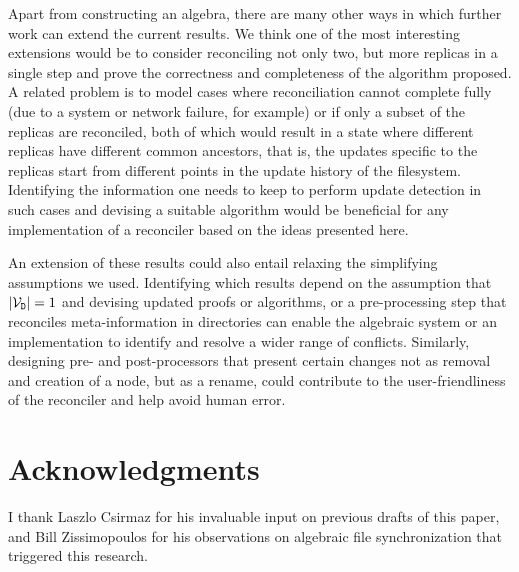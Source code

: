 \documentclass[12pt]{article}
\begin{document}
Apart from constructing an algebra,
there are many other ways in which further work can extend the current results.
We think one of the most interesting extensions would be to
consider reconciling not only two, but more replicas in a single step and
prove the correctness and completeness of the algorithm proposed.
A related problem is to model cases where reconciliation cannot
complete fully (due to a system or network failure, for example)
or if only a subset of the replicas are reconciled,
both of which would result in a state where different replicas
have different common ancestors, that is,
the updates specific to the replicas start from different points
in the update history of the filesystem.
Identifying the information one needs to keep to perform
update detection in such cases and devising a suitable algorithm
would be beneficial for any implementation of a reconciler
based on the ideas presented here.

An extension of these results could also entail relaxing
the simplifying assumptions we used.
Identifying which results depend on the assumption that $|\mathcal{V}_{\mathtt{D}}|=1$
and devising updated proofs or algorithms,
or a pre-processing step that reconciles meta-information in directories
can enable the algebraic system or an implementation
to identify and resolve a wider range of conflicts.
Similarly, designing pre- and post-processors that
present certain changes not as removal and creation of a node,
but as a rename,
could contribute to the user-friendliness of the reconciler
and help avoid human error.


\section{Acknowledgments}

I thank Laszlo Csirmaz for his invaluable input on previous drafts of this paper,
and Bill Zissimopoulos for his observations on algebraic file synchronization that triggered this research.



\begin{thebibliography}{99}



\end{thebibliography}
\end{document}
